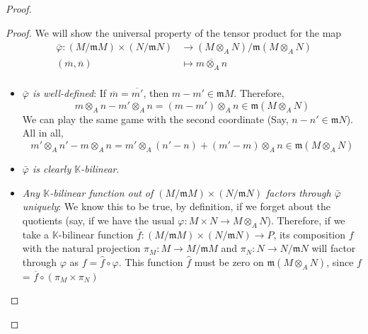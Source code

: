 \begin{problem}
\begin{enumerate}[label=(\theproblem.\arabic*),ref=\theproblem.\arabic*]
\begin{sol}
\begin{proof}
\begin{claim}
\begin{proof}
                                We will show the universal property of the tensor product for the map
                                \begin{align*}
                                    \bar{\varphi}: (M / \mathfrak{m} M) \times (N / \mathfrak{m} N) &\rightarrow (M \otimes_A N) / \mathfrak{m}(M \otimes_A N) \\
                                    (\overline{m}, \overline{n}) &\mapsto \overline{ m \otimes_A n} \\
                                \end{align*}

                                \begin{itemize}
                                    \item \emph{$\bar{\varphi}$ is well-defined}: If $\overline{m} = \overline{m'}$, then $m - m' \in \mathfrak{m}M$.
                                        Therefore,
                                        \[m \otimes_A n - m' \otimes_A n = (m - m') \otimes_A n \in \mathfrak{m}(M \otimes_A N)\]
                                        We can play the same game with the second coordinate (Say, $n - n' \in \mathfrak{m}N$).
                                        All in all,
                                        \[m' \otimes_A n' - m \otimes_A n = m' \otimes_A (n'-n) + (m'-m) \otimes_A n \in \mathfrak{m}(M \otimes_A N)\]
                                    \item \emph{$\bar{\varphi}$ is clearly $\mathbb{K}$-bilinear}.
                                    \item \emph{Any $\mathbb{K}$-bilinear function out of $(M / \mathfrak{m} M) \times (N / \mathfrak{m} N)$ factors through $\bar{\varphi}$ uniquely}:
                                        We know this to be true, by definition, if we forget about the quotients (say, if we have the usual $\varphi: M \times N \rightarrow M \otimes_A N$).
                                        Therefore, if we take a $\mathbb{K}$-bilinear function $\overline{f}: (M / \mathfrak{m} M) \times (N / \mathfrak{m} N) \rightarrow P$,
                                        its composition $f$ with the natural projection
                                        $\pi_M: M \rightarrow M / \mathfrak{m} M$ and $\pi_N: N \rightarrow N / \mathfrak{m} N$ will factor through $\varphi$ as $f = \hat{f} \circ \varphi$.
                                        This function $\hat{f}$ must be zero on $\mathfrak{m}(M \otimes_A N)$, since $f$ = $\overline{f} \circ (\pi_M \times \pi_N)$

\end{itemize}
\end{proof}
\end{claim}
\end{proof}
\end{sol}
\end{enumerate}
\end{problem}
